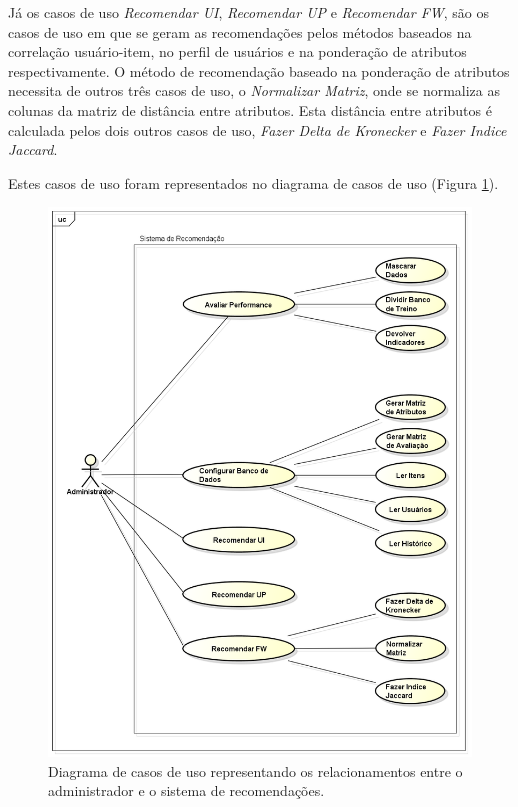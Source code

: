 Já os casos de uso \textit{Recomendar UI}, \textit{Recomendar UP} e \textit{Recomendar FW}, são os casos de uso em que se geram as recomendações pelos métodos baseados na correlação usuário-item, no perfil de usuários e na ponderação de atributos respectivamente. O método de recomendação baseado na ponderação de atributos necessita de outros três casos de uso, o \textit{Normalizar Matriz}, onde se normaliza as colunas da matriz de distância entre atributos. Esta distância entre atributos é calculada pelos dois outros casos de uso, \textit{Fazer Delta de Kronecker} e \textit{Fazer Indice Jaccard}.

 Estes casos de uso foram representados no diagrama de casos de uso (Figura \ref{fig:Diagrama de Casos de Uso}).

 \begin{figure}[htp]
    \begin{center}
    \includegraphics[width=1\textwidth]{img/CasosDeUso}
    \end{center}
    \caption{Diagrama de casos de uso representando os relacionamentos entre o administrador e o sistema de recomendações.}
    \label{fig:Diagrama de Casos de Uso}
\end{figure}

